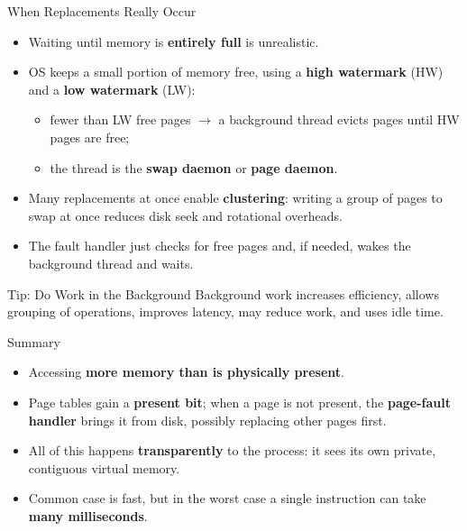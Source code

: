 \begin{frame}{When Replacements Really Occur}
\small

\begin{itemize}
    \item Waiting until memory is \textbf{entirely full} is unrealistic.
    \item OS keeps a small portion of memory free, using a
          \textbf{high watermark} (HW) and a \textbf{low watermark} (LW):
    \begin{itemize}
        \item fewer than LW free pages $\rightarrow$ a background thread
              evicts pages until HW pages are free;
        \item the thread is the \textbf{swap daemon} or
              \textbf{page daemon}.
    \end{itemize}
    \item Many replacements at once enable \textbf{clustering}: writing a group
          of pages to swap at once reduces disk seek and rotational overheads.
    \item The fault handler just checks for free pages and, if needed,
          wakes the background thread and waits.
\end{itemize}

\begin{block}{Tip: Do Work in the Background}
Background work increases efficiency, allows grouping of operations,
improves latency, may reduce work, and uses idle time.
\end{block}

\end{frame}

\begin{frame}{Summary}

\begin{itemize}
    \item Accessing \textbf{more memory than is physically present}.
    \item Page tables gain a \textbf{present bit}; when a page is not present,
          the \textbf{page-fault handler} brings it from disk, possibly
          replacing other pages first.
    \item All of this happens \textbf{transparently} to the process: it sees
          its own private, contiguous virtual memory.
    \item Common case is fast, but in the worst case a single instruction
          can take \textbf{many milliseconds}.
\end{itemize}

\end{frame}


